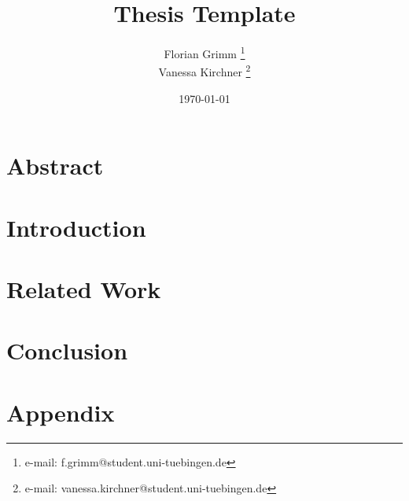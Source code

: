 \documentclass[a4paper,cleardoubleempty,BCOR1cm]{scrbook}
\title{Thesis Template}
\author{Florian Grimm \thanks{e-mail: f.grimm@student.uni-tuebingen.de}\\Vanessa Kirchner \thanks{e-mail: vanessa.kirchner@student.uni-tuebingen.de} }
\date{\today}
\begin{document}


\chapter*{Abstract}



\tableofcontents


\chapter{Introduction}


\chapter{Related Work}
\label{ch:relWork}




\chapter{Conclusion}



\appendix
\chapter{Appendix}




% 
%
%
%

\end{document}
